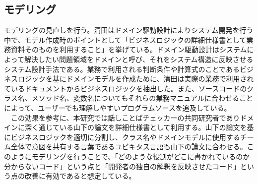 \documentclass[12pt, a4paper]{jreport}
\begin{document}
\subsection{モデリング}
モデリングの見直しを行う。清田\cite{Domein}はドメイン駆動設計によりシステム開発を行う中で、モデル作成時のポイントとして「ビジネスロジックの詳細仕様書として業務資料そのものを利用すること」を挙げている。ドメイン駆動設計はシステムによって解決したい問題領域をドメインと呼び、それをシステム構造に反映させるシステム設計手法である。業務で利用される判断条件や計算式のことであるビジネスロジックを基にドメインモデルを作成ために、清田は実際の業務で利用されているドキュメントからビジネスロジックを抽出した。また、ソースコードのクラス名、メソッド名、変数名についてもそれらの業務マニュアルに合わせることによって、ユーザーでも理解しやすいプログラムソースを追及している。
\\　この効果を参考に、本研究では話しことばチェッカーの共同研究者でありドメインに深く通じている山下の論文\cite{Yamashita}を詳細仕様書として利用する。山下の論文を基にビジネスロジックを適切に分割し、クラス名やドメインモデルに使用するチーム全体で意図を共有する言葉であるユビキタス言語も山下の論文に合わせる。このようにモデリングを行うことで、「どのような役割がどこに書かれているのか分からないコード」という点と「開発者の独自の解釈を反映させたコード」という点の改善に有効であると想定している。
\end{document}
